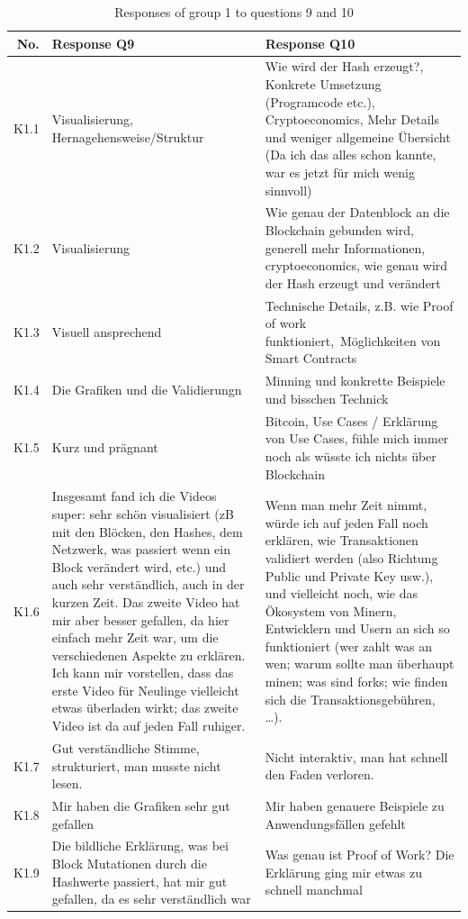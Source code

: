 \begin{table}[H]
    \centering
    \begin{tabularx}{\textwidth}{r|X|X}
        No. & Response Q9 & Response Q10 \\ \hline
         K1.1 & Visualisierung, Hernagehensweise/Struktur & Wie wird der Hash erzeugt?, Konkrete Umsetzung (Programcode etc.), Cryptoeconomics, Mehr Details und weniger allgemeine Übersicht (Da ich das alles schon kannte, war es jetzt für mich wenig sinnvoll)\\
         K1.2 & Visualisierung & Wie genau der Datenblock an die Blockchain gebunden wird, generell mehr Informationen, cryptoeconomics, wie genau wird der Hash erzeugt und verändert\\
         K1.3 & Visuell ansprechend & Technische Details, z.B. wie Proof of work funktioniert, Möglichkeiten von Smart Contracts \\
         K1.4 & Die Grafiken und die Validierungn  & Minning und konkrette Beispiele und bisschen Technick \\
         K1.5 & Kurz und prägnant & Bitcoin, Use Cases / Erklärung von Use Cases, fühle mich immer noch als wüsste ich nichts über Blockchain \\
         K1.6 & Insgesamt fand ich die Videos super: sehr schön visualisiert (zB mit den Blöcken, den Hashes, dem Netzwerk, was passiert wenn ein Block verändert wird, etc.) und auch sehr verständlich, auch in der kurzen Zeit. Das zweite Video hat mir aber besser gefallen, da hier einfach mehr Zeit war, um die verschiedenen Aspekte zu erklären. Ich kann mir vorstellen, dass das erste Video für Neulinge vielleicht etwas überladen wirkt; das zweite Video ist da auf jeden Fall ruhiger. & Wenn man mehr Zeit nimmt, würde ich auf jeden Fall noch erklären, wie Transaktionen validiert werden (also Richtung Public und Private Key usw.), und vielleicht noch, wie das Ökosystem von Minern, Entwicklern und Usern an sich so funktioniert (wer zahlt was an wen; warum sollte man überhaupt minen; was sind forks; wie finden sich die Transaktionsgebühren, …).\\
         K1.7 & Gut verständliche Stimme, strukturiert, man musste nicht lesen. & Nicht interaktiv, man hat schnell den Faden verloren. \\
         K1.8 & Mir haben die Grafiken sehr gut gefallen & Mir haben genauere Beispiele zu Anwendungsfällen gefehlt \\
         K1.9 & Die bildliche Erklärung, was bei Block Mutationen durch die Hashwerte passiert, hat mir gut gefallen, da es sehr verständlich war & Was genau ist Proof of Work? Die Erklärung ging mir etwas zu schnell manchmal \\
    \end{tabularx}
    \caption{Responses of group 1 to questions 9 and 10}
    \label{tab:Video9und10}
\end{table}



